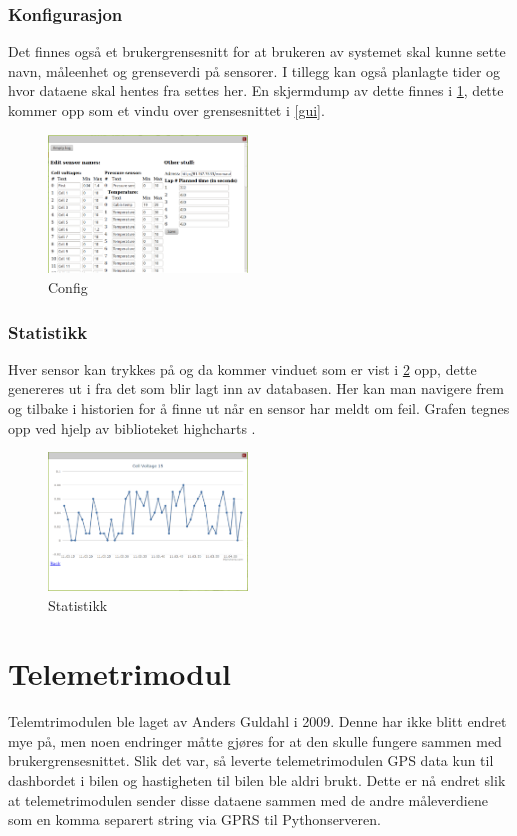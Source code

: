 \subsubsection{Konfigurasjon}
Det finnes også et brukergrensesnitt for at brukeren av systemet skal kunne sette navn, måleenhet og grenseverdi på sensorer. I tillegg kan også planlagte tider og hvor dataene skal hentes fra settes her.
En skjermdump av dette finnes i \ref{config}, dette kommer opp som et vindu over grensesnittet i \ref{gui}.
\begin{figure}[H]
\caption{Config} 
\label{config}
\includegraphics[width=200px]{images/config.png}
\end{figure}

\subsubsection{Statistikk}
Hver sensor kan trykkes på og da kommer vinduet som er vist i \ref{stats} opp, dette genereres ut i fra det som blir lagt inn av databasen. Her kan man navigere frem og tilbake i historien for å finne ut når en sensor har meldt om feil. Grafen tegnes opp ved hjelp av biblioteket highcharts \cite{highcharts}.
\begin{figure}[H]
\caption{Statistikk} 
\label{stats}
\includegraphics[width=200px]{images/stat.png}
\end{figure}
\section{Telemetrimodul}
Telemtrimodulen ble laget av Anders Guldahl \cite{telemetrithesis} i 2009. Denne har ikke blitt endret mye på, men noen endringer måtte gjøres for at den skulle fungere sammen med brukergrensesnittet.
Slik det var, så leverte telemetrimodulen GPS data kun til dashbordet i bilen og hastigheten til bilen ble aldri brukt. Dette er nå endret slik at telemetrimodulen sender disse dataene sammen med de andre måleverdiene som en komma separert string via GPRS til Pythonserveren.

